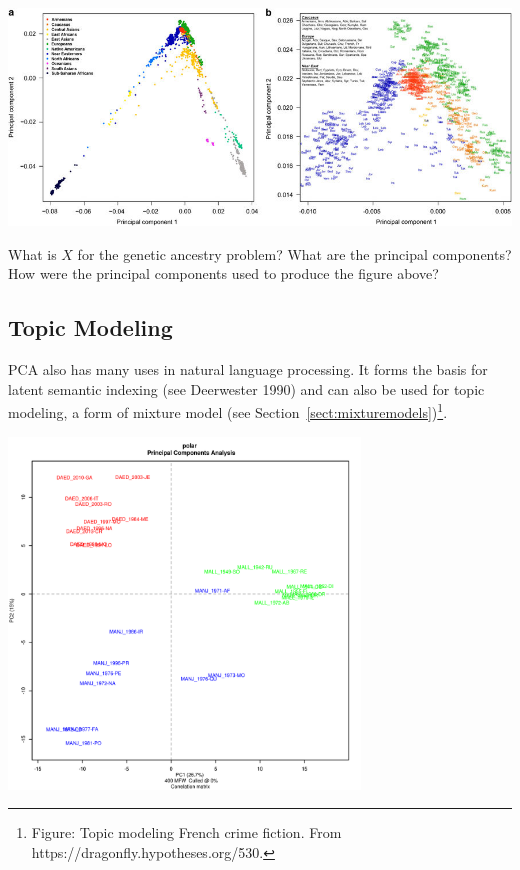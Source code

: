 \begin{center}
\includegraphics[width=\textwidth]{img/l04-genetics.jpg}
\end{center}

\begin{question}{}
What is $X$ for the genetic ancestry problem? What are the principal components? How were the principal components used to produce the figure above?
\end{question}

\subsection{Topic Modeling}

PCA also has many uses in natural language processing. It forms the basis for latent semantic indexing (see Deerwester 1990) and can also be used for topic modeling, a form of mixture model (see Section~\ref{sect:mixturemodels})\footnote{Figure: Topic modeling French crime fiction. From https://dragonfly.hypotheses.org/530.}.

\begin{center}
\includegraphics[width=0.7\textwidth]{img/l04-topics.png}
\end{center}

